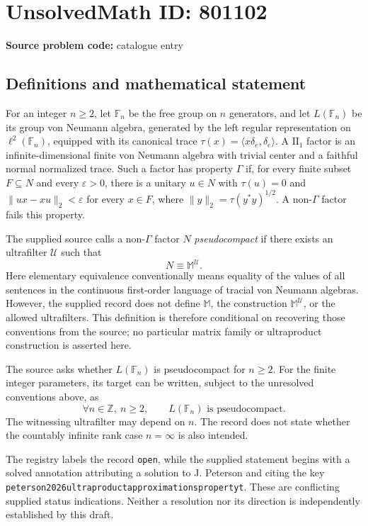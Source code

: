 \documentclass[11pt]{article}
\begin{document}
\section*{UnsolvedMath ID: 801102}
\textbf{Source problem code:} catalogue entry
\subsection{Definitions and mathematical statement}
For an integer \(n\geq 2\), let \(\mathbb F_n\) be the free group on \(n\) generators, and let \(L(\mathbb F_n)\) be its group von Neumann algebra, generated by the left regular representation on \(\ell^2(\mathbb F_n)\), equipped with its canonical trace \(\tau(x)=\langle x\delta_e,\delta_e\rangle\). A \(\mathrm{II}_1\) factor is an infinite-dimensional finite von Neumann algebra with trivial center and a faithful normal normalized trace. Such a factor has property \(\Gamma\) if, for every finite subset \(F\subseteq N\) and every \(\varepsilon>0\), there is a unitary \(u\in N\) with \(\tau(u)=0\) and \(\|ux-xu\|_2<\varepsilon\) for every \(x\in F\), where \(\|y\|_2=\tau(y^*y)^{1/2}\). A non-\(\Gamma\) factor fails this property.

The supplied source calls a non-\(\Gamma\) factor \(N\) \emph{pseudocompact} if there exists an ultrafilter \(\mathcal U\) such that
\[
N\equiv\mathbb M^{\mathcal U}.
\]
Here elementary equivalence conventionally means equality of the values of all sentences in the continuous first-order language of tracial von Neumann algebras. However, the supplied record does not define \(\mathbb M\), the construction \(\mathbb M^{\mathcal U}\), or the allowed ultrafilters. This definition is therefore conditional on recovering those conventions from the source; no particular matrix family or ultraproduct construction is asserted here.

The source asks whether \(L(\mathbb F_n)\) is pseudocompact for \(n\geq 2\). For the finite integer parameters, its target can be written, subject to the unresolved conventions above, as
\[
\forall n\in\mathbb Z,\ n\geq 2,\qquad
L(\mathbb F_n)\text{ is pseudocompact}.
\]
The witnessing ultrafilter may depend on \(n\). The record does not state whether the countably infinite rank case \(n=\infty\) is also intended.

The registry labels the record \texttt{open}, while the supplied statement begins with a solved annotation attributing a solution to J. Peterson and citing the key \texttt{peterson2026ultraproductapproximationspropertyt}. These are conflicting supplied status indications. Neither a resolution nor its direction is independently established by this draft.
\end{document}
